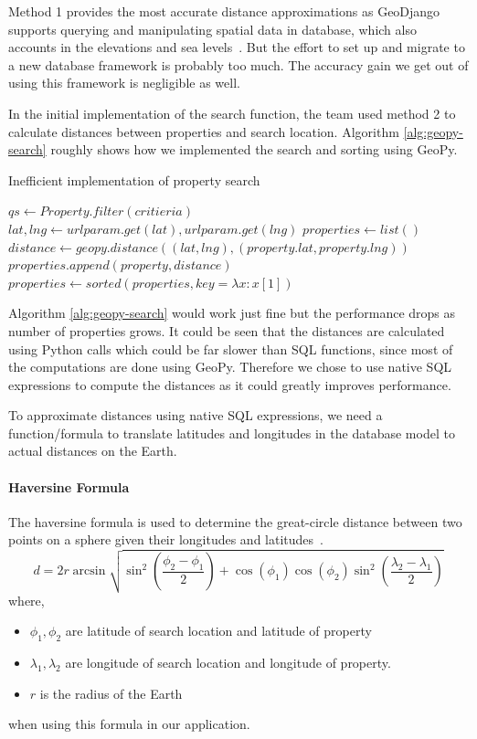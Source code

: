 Method 1 provides the most accurate distance approximations as GeoDjango supports
querying and manipulating spatial data in database, which also accounts in the
elevations and sea levels~\parencite{geodjango-raster-lookups}. But the effort to
set up and migrate to a new database framework is probably too much. The
accuracy gain we get out of using this framework is negligible as well.

In the initial implementation of the search function, the team used method 2 to
calculate distances between properties and search location. Algorithm
\ref{alg:geopy-search} roughly shows how we implemented the search and sorting
using GeoPy.

\begin{algorithm}
  \caption{Inefficient implementation of property search}\label{alg:geopy-search}
  \begin{algorithmic}
    \STATE $qs\gets Property.filter(critieria)$
    \STATE $lat, lng\gets urlparam.get(lat), urlparam.get(lng)$
    \STATE $properties\gets list()$
    \STATE $distance\gets geopy.distance((lat, lng), (property.lat, property.lng))$
    \STATE $properties.append(property, distance)$
    \ENDFOR
    \STATE $properties\gets sorted(properties, key=\lambda x: x[1])$
  \end{algorithmic}
\end{algorithm}

Algorithm \ref{alg:geopy-search} would work just fine but the performance drops
as number of properties grows. It could be seen that the distances are
calculated using Python calls which could be far slower than SQL functions,
since most of the computations are done using GeoPy. Therefore we chose to use
native SQL expressions to compute the distances as it could greatly improves
performance.

To approximate distances using native SQL expressions, we need a
function/formula to translate latitudes and longitudes in the database model to
actual distances on the Earth.

\paragraph{Haversine Formula}\label{eq:haversine}
The haversine formula is used to determine the great-circle distance between two
points on a sphere given their longitudes and
latitudes~\parencite{haversine-formula}.
\[
  d = 2r\arcsin{\sqrt{\sin^2\left(\frac{\phi_2 - \phi_1}{2}\right) +
      \cos(\phi_1)\cos(\phi_2)\sin^2\left(\frac{\lambda_2 - \lambda_1}{2}\right)}}
\]
where,
\begin{itemize}
  \item $\phi_1, \phi_2$ are latitude of search location and latitude of property
  \item $\lambda_1, \lambda_2$ are longitude of search location and longitude of
    property.
  \item $r$ is the radius of the Earth
\end{itemize}
when using this formula in our application.

